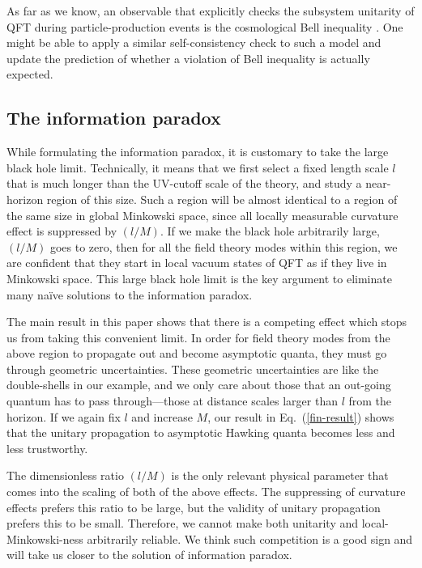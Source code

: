 \documentclass[aps,showpacs,onecolumn,floats,prd,superscriptaddress,nofootinbib]{revtex4-1}
\begin{document}
As far as we know, an observable that explicitly checks the subsystem unitarity of QFT during particle-production events is the cosmological Bell inequality \cite{Mal15}. 
One might be able to apply a similar self-consistency check to such a model and update the prediction of whether a violation of Bell inequality is actually expected.


\subsection{The information paradox}

While formulating the information paradox, it is customary to take the large black hole limit.
Technically, it means that we first select a fixed length scale $l$ that is much longer than the UV-cutoff scale of the theory, and study a near-horizon region of this size.
Such a region will be almost identical to a region of the same size in global Minkowski space, since all locally measurable curvature effect is suppressed by $(l/M)$.
If we make the black hole arbitrarily large, $(l/M)$ goes to zero, then for all the field theory modes within this region, we are confident that they start in local vacuum states of QFT as if they live in Minkowski space.
This large black hole limit is the key argument to eliminate many na\"ive solutions to the information paradox.

The main result in this paper shows that there is a competing effect which stops us from taking this convenient limit.
In order for field theory modes from the above region to propagate out and become asymptotic quanta, they must go through geometric uncertainties.
These geometric uncertainties are like the double-shells in our example, and we only care about those that an out-going quantum has to pass through---those at distance scales larger than $l$ from the horizon.
If we again fix $l$ and increase $M$, our result in Eq.~(\ref{fin-result}) shows that the unitary propagation to asymptotic Hawking quanta becomes less and less trustworthy.
 
The dimensionless ratio $(l/M)$ is the only relevant physical parameter that comes into the scaling of both of the above effects.
The suppressing of curvature effects prefers this ratio to be large, but the validity of unitary propagation prefers this to be small.
Therefore, we cannot make both unitarity and local-Minkowski-ness arbitrarily reliable.
We think such competition is a good sign and will take us closer to the solution of information paradox.
\end{document}
